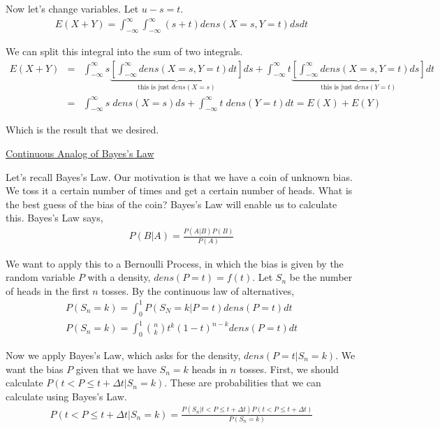 Now let's change variables.  Let $u-s=t$.  
\begin{eqnarray*}
E(X+Y)=\int_{-\infty}^{\infty}\int_{-\infty}^{\infty}\!\!\!(s+t)dens(X=s,Y=t)dsdt
\end{eqnarray*}

We can split this integral into the sum of two integrals.
\begin{eqnarray*}
E(X+Y)&=&\int_{-\infty}^{\infty}\!\!\!s\underbrace{\left[\int_{-\infty}^{\infty}\!\!\!dens(X=s,Y=t)dt\right]}_{\mbox{this is just }dens(X=s)}ds+\int_{-\infty}^{\infty}\!\!\!t\underbrace{\left[\int_{-\infty}^{\infty}\!\!\!\!dens(X=s,Y=t)ds\right]}_{\mbox{this is just }dens(Y=t)}dt\\
&=&\int_{-\infty}^{\infty}\!\!\!\!s\;dens(X=s)ds+\int_{-\infty}^{\infty}\!\!\!\! t\;dens(Y=t)dt=E(X)+E(Y)
\end{eqnarray*}

Which is the result that we desired.

\noindent\underline{Continuous Analog of Bayes's Law}

Let's recall Bayes's Law.  Our motivation is that we have a coin of unknown bias.  We toss it a certain number of times and get a certain number of heads.  What is the best guess of the bias of the coin?  Bayes's Law will enable us to calculate this.  Bayes's Law says,
\begin{eqnarray*}
P(B|A)=\frac{P(A|B)P(B)}{P(A)}
\end{eqnarray*}

We want to apply this to a Bernoulli Process, in which the bias is given by the random variable $P$ with a density, $dens(P=t)=f(t)$.  Let $S_n$ be the number of heads in the first $n$ tosses.  By the continuous law of alternatives,
\begin{eqnarray*}
P(S_n=k)=\int_{0}^{1}P(S_N=k|P=t)dens(P=t)dt \\
P(S_n=k)=\int_0^1 {n\choose k}t^k(1-t)^{n-k}dens(P=t)dt
\end{eqnarray*}

Now we apply Bayes's Law, which asks for the density, $dens(P=t|S_n=k)$.  We want the bias $P$ given that we have $S_n=k$ heads in $n$ tosses.  First, we should calculate $P(t<P\leq t+\Delta t|S_n=k)$.  These are probabilities that we can calculate using Bayes's Law.  
\begin{eqnarray*}
P(t<P\leq t+\Delta t|S_n=k)=\frac{P(S_n|t<P\leq t+\Delta t)P(t<P\leq t+\Delta t)}{P(S_n=k)}
\end{eqnarray*}

